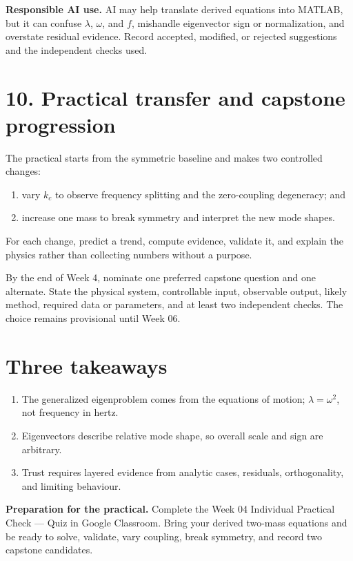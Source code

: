 \documentclass[11pt,a4paper]{article}
\begin{document}
\begin{aibox}
\textbf{Responsible AI use.} AI may help translate derived equations into MATLAB, but it can confuse $\lambda$, $\omega$, and $f$, mishandle eigenvector sign or normalization, and overstate residual evidence. Record accepted, modified, or rejected suggestions and the independent checks used.
\end{aibox}

\section*{10. Practical transfer and capstone progression}
The practical starts from the symmetric baseline and makes two controlled changes:
\begin{enumerate}[nosep,leftmargin=6mm]
  \item vary $k_c$ to observe frequency splitting and the zero-coupling degeneracy; and
  \item increase one mass to break symmetry and interpret the new mode shapes.
\end{enumerate}
For each change, predict a trend, compute evidence, validate it, and explain the physics rather than collecting numbers without a purpose.

By the end of Week 4, nominate one preferred capstone question and one alternate. State the physical system, controllable input, observable output, likely method, required data or parameters, and at least two independent checks. The choice remains provisional until Week 06.

\section*{Three takeaways}
\begin{enumerate}[nosep,leftmargin=6mm]
  \item The generalized eigenproblem comes from the equations of motion; $\lambda=\omega^2$, not frequency in hertz.
  \item Eigenvectors describe relative mode shape, so overall scale and sign are arbitrary.
  \item Trust requires layered evidence from analytic cases, residuals, orthogonality, and limiting behaviour.
\end{enumerate}

\begin{keybox}
\textbf{Preparation for the practical.} Complete the Week 04 Individual Practical Check --- Quiz in Google Classroom. Bring your derived two-mass equations and be ready to solve, validate, vary coupling, break symmetry, and record two capstone candidates.
\end{keybox}
\end{document}
